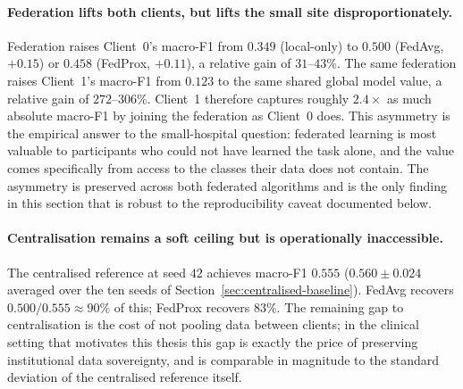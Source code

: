 \documentclass[11pt,a4paper]{report}
\begin{document}
\paragraph{Federation lifts both clients, but lifts the small site
disproportionately.}
Federation raises Client~0's macro-F1 from $0.349$ (local-only) to
$0.500$ (FedAvg, $+0.15$) or $0.458$ (FedProx, $+0.11$), a relative
gain of $31$--$43\%$. The same federation raises Client~1's macro-F1
from $0.123$ to the same shared global model value, a relative gain
of $272$--$306\%$. Client~1 therefore captures roughly $2.4\times$
as much absolute macro-F1 by joining the federation as Client~0
does. This asymmetry is the empirical answer to the small-hospital
question: federated learning is most valuable to participants who
could not have learned the task alone, and the value comes
specifically from access to the classes their data does not contain.
The asymmetry is preserved across both federated algorithms and is
the only finding in this section that is robust to the
reproducibility caveat documented below.

\paragraph{Centralisation remains a soft ceiling but is
operationally inaccessible.}
The centralised reference at seed $42$ achieves macro-F1 $0.555$
($0.560 \pm 0.024$ averaged over the ten seeds of
Section~\ref{sec:centralised-baseline}). FedAvg recovers
$0.500 / 0.555 \approx 90\%$ of this; FedProx recovers $83\%$. The
remaining gap to centralisation is the cost of not pooling data
between clients; in the clinical setting that motivates this thesis
this gap is exactly the price of preserving institutional data
sovereignty, and is comparable in magnitude to the standard
deviation of the centralised reference itself.
\end{document}
